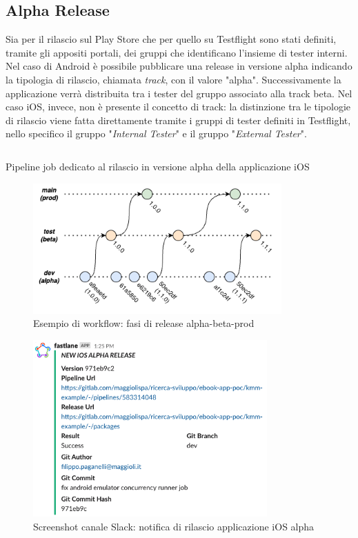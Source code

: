 \subsection{Alpha Release}
Sia per il rilascio sul Play Store che per quello su Testflight sono stati definiti, tramite gli appositi portali, dei gruppi che identificano l'insieme di tester interni. Nel caso di Android è possibile pubblicare una release in versione alpha indicando la tipologia di rilascio, chiamata \textit{track}, con il valore "alpha". Successivamente la applicazione verrà distribuita tra i tester del gruppo associato alla track beta. Nel caso iOS, invece, non è presente il concetto di track: la distinzione tra le tipologie di rilascio viene fatta direttamente tramite i gruppi di tester definiti in Testflight, nello specifico il gruppo "\textit{Internal Tester}" e il gruppo "\textit{External Tester}".

\begin{listing}[H]
\inputminted{yaml}{code/4-ios-alpha}
\caption{Pipeline job dedicato al rilascio in versione alpha della applicazione iOS}
\end{listing}

\begin{figure}[H]
\centering
\includegraphics[width=0.85\textwidth]{img/tesi-18-release-flow.drawio.png}
\caption{Esempio di workflow: fasi di release alpha-beta-prod}
\end{figure}

\begin{figure}[H]
\centering
\includegraphics[width=0.8\textwidth]{img/Screenshot 2022-07-08 at 17.48.40.png}
\caption{Screenshot canale Slack: notifica di rilascio applicazione iOS alpha}
\end{figure}

